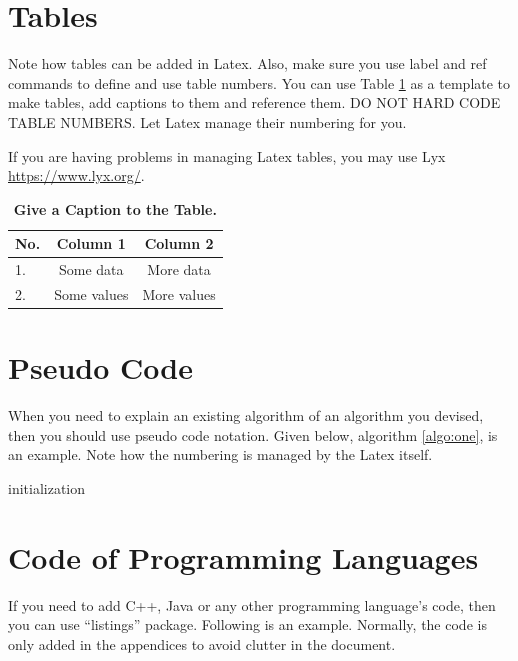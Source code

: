 \section{Tables}
Note how tables can be added in Latex.  Also, make sure you use label and ref commands to define and use table numbers.  You can use Table \ref{tbl:SomeTable} as a template to make tables, add captions to them and reference them.  DO NOT HARD CODE TABLE NUMBERS.  Let Latex manage their numbering for you.

If you are having problems in managing Latex tables, you may use Lyx \url{https://www.lyx.org/}. 


\begin{table}[hbt]

\begin{center}
\caption{\label{tbl:SomeTable} \textbf{Give a Caption to the Table.}}
\begin{tabular}{|l|c|c|} 
\hline
\textbf{No.}&\textbf{Column 1}&\textbf{Column 2}\\
\hline
1.&Some data&More data\\
\hline
2.&Some values&More values\\
\hline
\end {tabular}

\end{center}

\end{table}

\section{Pseudo Code}
When you need to explain an existing algorithm of an algorithm you devised, then you should use pseudo code notation. Given below, algorithm  \ref{algo:one}, is an example. Note how the numbering is managed by the Latex itself.

\begin{algorithm}[H]
 initialization\;
 \caption{How to write algorithms}
 \label{algo:one}
\end{algorithm}

\section{Code of Programming Languages}
If you need to add C++, Java or any other programming language's code, then you can use ``listings'' package. Following is an example. Normally, the code is only added in the appendices to avoid clutter in the document.

